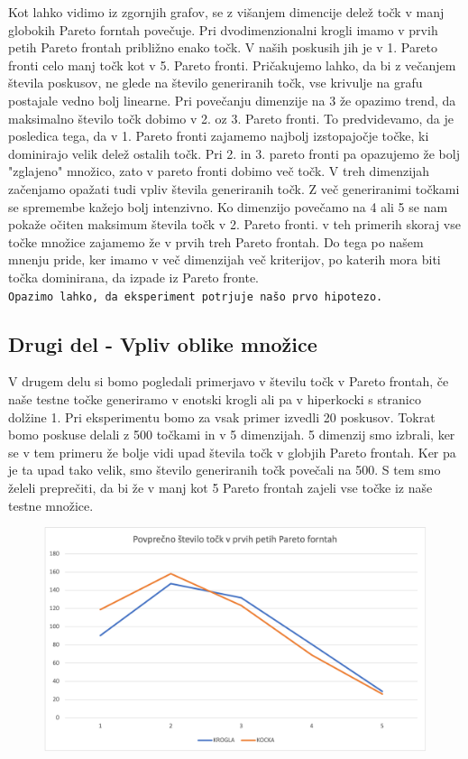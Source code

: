 \documentclass{article}
\begin{document}
Kot lahko vidimo iz zgornjih grafov, se z višanjem dimencije delež točk v manj globokih Pareto forntah povečuje. Pri dvodimenzionalni krogli imamo v prvih petih Pareto frontah približno enako točk. V naših poskusih jih je v 1. Pareto fronti celo manj točk kot v 5. Pareto fronti. Pričakujemo lahko, da bi z večanjem števila poskusov, ne glede na število generiranih točk, vse krivulje na grafu postajale vedno bolj linearne. Pri povečanju dimenzije na 3 že opazimo trend, da maksimalno število točk dobimo v 2. oz 3. Pareto fronti. To predvidevamo, da je posledica tega, da v 1. Pareto fronti zajamemo najbolj izstopajočje točke, ki dominirajo velik delež ostalih točk. Pri 2. in 3. pareto fronti pa opazujemo že bolj "zglajeno" množico, zato v pareto fronti dobimo več točk. V treh dimenzijah začenjamo opažati tudi vpliv števila generiranih točk. Z več generiranimi točkami se spremembe kažejo bolj intenzivno. Ko dimenzijo povečamo na 4 ali 5 se nam pokaže očiten maksimum števila točk v 2. Pareto fronti. v teh primerih skoraj vse točke množice zajamemo že v prvih treh Pareto frontah. Do tega po našem mnenju pride, ker imamo v več dimenzijah več kriterijov, po katerih mora biti točka dominirana, da izpade iz Pareto fronte. \\
\texttt{Opazimo lahko, da eksperiment potrjuje našo prvo hipotezo.}

\subsection{Drugi del - Vpliv oblike množice}
V drugem delu si bomo pogledali primerjavo v številu točk v Pareto frontah, če naše testne točke generiramo v enotski krogli ali pa v hiperkocki s stranico dolžine 1. Pri eksperimentu bomo za vsak primer izvedli 20 poskusov. Tokrat bomo poskuse delali z 500 točkami in v 5 dimenzijah. 5 dimenzij smo izbrali, ker se v tem primeru že bolje vidi upad števila točk v globjih Pareto frontah. Ker pa je ta upad tako velik, smo število generiranih točk povečali na 500. S tem smo želeli preprečiti, da bi že v manj kot 5 Pareto frontah zajeli vse točke iz naše testne množice.

\begin{figure}[htbp]
    \includegraphics[width=130mm]{Slike/Graf2.png}
\centering
\end{figure}
\end{document}
